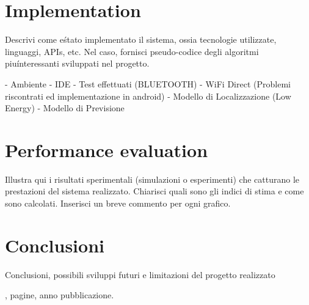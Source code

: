 \documentclass[conference]{IEEEtran}
\begin{document}
\section{Implementation}
Descrivi come e\' stato implementato il sistema, ossia tecnologie utilizzate, linguaggi, APIs, etc. Nel caso, fornisci pseudo-codice degli algoritmi
piu\' interessanti sviluppati nel progetto.

- Ambiente
- IDE
- Test effettuati (BLUETOOTH)
- WiFi Direct (Problemi riscontrati ed implementazione in android)
- Modello di Localizzazione (Low Energy)
- Modello di Previsione

\section{Performance evaluation}
Illustra qui i risultati sperimentali (simulazioni o esperimenti) che catturano le prestazioni del sistema realizzato. Chiarisci quali sono gli indici di stima
e come sono calcolati. Inserisci un breve commento per ogni grafico.

\section{Conclusioni}
Conclusioni, possibili sviluppi futuri e limitazioni del progetto realizzato


\begin{thebibliography}{15}

, pagine, anno pubblicazione.

\end{thebibliography}
\end{document}
